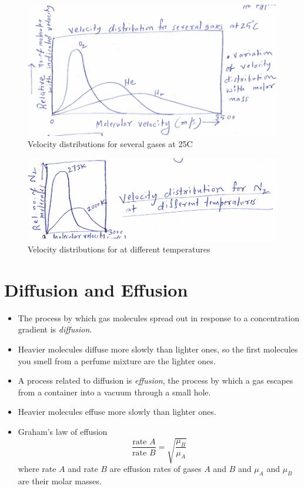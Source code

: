 \documentclass[
	chapter=5,
	title={Gases},
	showanswers=true,
]{chem122notes}
\begin{document}
\begin{figure}[H]
	\centering
	\includegraphics[width=\textwidth]{chapter6/velocity_distributions}
	\caption{Velocity distributions for several gases at 25\textdegree{}C}
	\label{fig:gas-velocity-distributions}
\end{figure}

\begin{figure}[H]
	\centering
	\includegraphics[width=\textwidth]{chapter6/velocity_distributions_temperatures}
	\caption{Velocity distributions for  at different temperatures}
	\label{fig:N2-velocity-distributions}
\end{figure}

\section{Diffusion and Effusion}\label{sec:diffusion-and-effusion}
\begin{itemize}
	\item The process by which gas molecules spread out in response to a concentration gradient is \emph{diffusion}.
	\item Heavier molecules diffuse more slowly than lighter ones, so the first molecules you smell from a perfume mixture are the lighter ones.
	\item A process related to diffusion is \emph{effusion}, the process by which a gas escapes from a container into a vacuum through a small hole.
	\item Heavier molecules effuse more slowly than lighter ones.
	\item Graham's law of effusion
	\begin{equation}
		\frac{\mbox{rate } A}{\mbox{rate } B} = \sqrt{\frac{\mu_{B}}{\mu_{A}}}
		\label{eq:grahams-law-of-effusion}
	\end{equation}
	where rate $A$ and rate $B$ are effusion rates of gases $A$ and $B$ and $\mu_{A}$ and $\mu_{B}$ are their molar masses.
\end{itemize}
\end{document}
